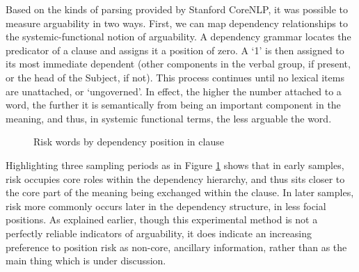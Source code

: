 
    Based on the kinds of parsing provided by Stanford CoreNLP, it was possible to measure arguability in two ways. First, we can map dependency relationships to the systemic-functional notion of arguability. A dependency grammar locates the predicator of a clause and assigns it a position of zero. A `1' is then assigned to its most immediate dependent (other components in the verbal group, if present, or the head of the Subject, if not). This process continues until no lexical items are unattached, or `ungoverned'. In effect, the higher the number attached to a word, the further it is semantically from being an important component in the meaning, and thus, in systemic functional terms, the less arguable the word.

    \begin{figure}[htb!]
    \centering
    \caption{Risk words by dependency position in clause}
    \label{fig:depnum}
    \end{figure}
    Highlighting three sampling periods as in Figure \ref{fig:depnum} shows that in early samples, risk occupies core roles within the dependency hierarchy, and thus sits closer to the core part of the meaning being exchanged within the clause. In later samples, risk more commonly occurs later in the dependency structure, in less focial positions. As explained earlier, though this experimental method is not a perfectly reliable indicators of arguability, it does indicate an increasing preference to position risk as non-core, ancillary information, rather than as the main thing which is under discussion.

